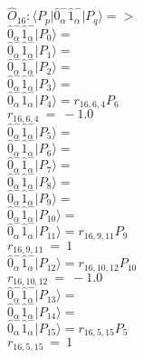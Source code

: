 \documentclass[14pt]{article}
\begin{document}
    $\hat{O}_{16}:  \langle{P_p}\vert \hat{0}_{\alpha}^{-}\hat{1}_{\alpha}^{-} \vert{P_q}\rangle => $ \\ 
    $ \hat{0}_{\alpha}^{-}\hat{1}_{\alpha}^{-} \vert{P_{0}}\rangle =  $ \\ 
    $ \hat{0}_{\alpha}^{-}\hat{1}_{\alpha}^{-} \vert{P_{1}}\rangle =  $ \\ 
    $ \hat{0}_{\alpha}^{-}\hat{1}_{\alpha}^{-} \vert{P_{2}}\rangle =  $ \\ 
    $ \hat{0}_{\alpha}^{-}\hat{1}_{\alpha}^{-} \vert{P_{3}}\rangle =  $ \\ 
    $ \hat{0}_{\alpha}^{-}\hat{1}_{\alpha}^{-} \vert{P_{4}}\rangle = {r}_{16,6,4}P_{6} $ \\ 
    ${r}_{16,6,4}\ =\ -1.0 $ \\ 
    $ \hat{0}_{\alpha}^{-}\hat{1}_{\alpha}^{-} \vert{P_{5}}\rangle =  $ \\ 
    $ \hat{0}_{\alpha}^{-}\hat{1}_{\alpha}^{-} \vert{P_{6}}\rangle =  $ \\ 
    $ \hat{0}_{\alpha}^{-}\hat{1}_{\alpha}^{-} \vert{P_{7}}\rangle =  $ \\ 
    $ \hat{0}_{\alpha}^{-}\hat{1}_{\alpha}^{-} \vert{P_{8}}\rangle =  $ \\ 
    $ \hat{0}_{\alpha}^{-}\hat{1}_{\alpha}^{-} \vert{P_{9}}\rangle =  $ \\ 
    $ \hat{0}_{\alpha}^{-}\hat{1}_{\alpha}^{-} \vert{P_{10}}\rangle =  $ \\ 
    $ \hat{0}_{\alpha}^{-}\hat{1}_{\alpha}^{-} \vert{P_{11}}\rangle = {r}_{16,9,11}P_{9} $ \\ 
    ${r}_{16,9,11}\ =\ 1 $ \\ 
    $ \hat{0}_{\alpha}^{-}\hat{1}_{\alpha}^{-} \vert{P_{12}}\rangle = {r}_{16,10,12}P_{10} $ \\ 
    ${r}_{16,10,12}\ =\ -1.0 $ \\ 
    $ \hat{0}_{\alpha}^{-}\hat{1}_{\alpha}^{-} \vert{P_{13}}\rangle =  $ \\ 
    $ \hat{0}_{\alpha}^{-}\hat{1}_{\alpha}^{-} \vert{P_{14}}\rangle =  $ \\ 
    $ \hat{0}_{\alpha}^{-}\hat{1}_{\alpha}^{-} \vert{P_{15}}\rangle = {r}_{16,5,15}P_{5} $ \\ 
    ${r}_{16,5,15}\ =\ 1 $ \\ 
    
\end{document}

